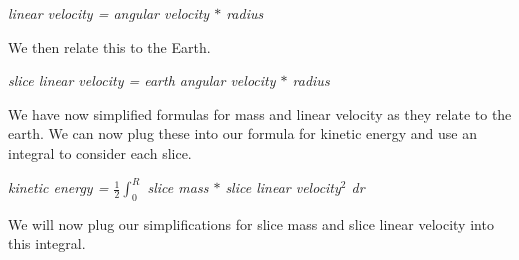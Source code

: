 \documentclass[a4paper, 11pt, oneside]{book} %
\begin{document}
\vspace{0.5\baselineskip} %
\vspace{0.5\baselineskip} %

\textit{linear velocity = angular velocity $*$ radius}\\

\vspace{0.5\baselineskip} %
\vspace{0.5\baselineskip} %

We then relate this to the Earth.\\

\vspace{0.5\baselineskip} %
\vspace{0.5\baselineskip} %

\textit{slice linear velocity = earth angular velocity $*$ radius}\\

\vspace{0.5\baselineskip} %
\vspace{0.5\baselineskip} %

We have now simplified formulas for mass and linear velocity as they relate to the earth. We can now plug these into our formula for kinetic energy and use an integral to consider each slice.\\

\vspace{0.5\baselineskip} %
\vspace{0.5\baselineskip} %

\textit{kinetic energy = $\frac{1}{2} \int_{0}^{R}$ slice mass $*$ slice linear velocity$^2$ dr}\\

\vspace{0.5\baselineskip} %
\vspace{0.5\baselineskip} %

We will now plug our simplifications for slice mass and slice linear velocity into this integral.\\

\vspace{0.5\baselineskip} %
\vspace{0.5\baselineskip} %
\end{document}
